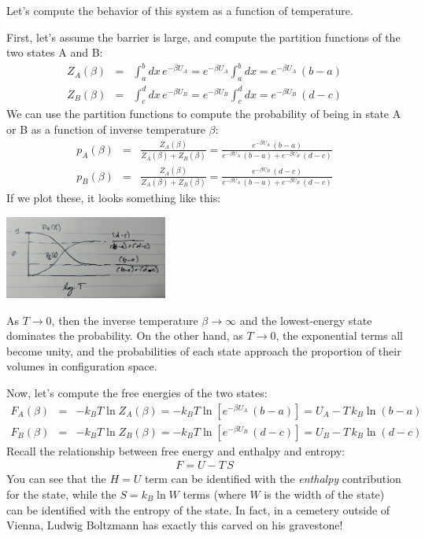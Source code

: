 \documentclass[english,course]{lecture}
\begin{document}
Let's compute the behavior of this system as a function of temperature.

First, let's assume the barrier is large, and compute the partition functions of the two states A and B:
\begin{eqnarray}
Z_A(\beta) &=& \int_a^b dx \, e^{-\beta U_A} = e^{-\beta U_A} \int_a^b dx = e^{-\beta U_A} \, (b-a) \\
Z_B(\beta) &=& \int_c^d dx \, e^{-\beta U_B} = e^{-\beta U_B} \int_c^d dx = e^{-\beta U_B} \, (d-c)
\end{eqnarray}
We can use the partition functions to compute the probability of being in state A or B as a function of inverse temperature $\beta$:
\begin{eqnarray}
p_A(\beta) &=& \frac{Z_A(\beta)}{Z_A(\beta) + Z_B(\beta)} = \frac{e^{-\beta U_A} \, (b-a)}{ e^{-\beta U_A} \, (b-a) + e^{-\beta U_B} \, (d-c) } \\
p_B(\beta) &=& \frac{Z_A(\beta)}{Z_A(\beta) + Z_B(\beta)} = \frac{e^{-\beta U_B} \, (d-c)}{ e^{-\beta U_A} \, (b-a) + e^{-\beta U_B} \, (d-c) }
\end{eqnarray}
If we plot these, it looks something like this:

\begin{centering}
\includegraphics[width=0.4\textwidth]{figures/two-state-probability.jpg}

\end{centering}

As $T \rightarrow 0$, then the inverse temperature $\beta \rightarrow \infty$ and the lowest-energy state dominates the probability.
On the other hand, as $T \rightarrow 0$, the exponential terms all become unity, and the probabilities of each state approach the proportion of their volumes in configuration space.

Now, let's compute the free energies of the two states:
\begin{eqnarray}
F_A(\beta) &=& - k_B T \ln Z_A(\beta) = - k_B T \ln \left[ e^{-\beta U_A} \, (b-a) \right] = U_A - T \, k_B  \ln (b-a)  \\
F_B(\beta) &=& - k_B T \ln Z_B(\beta) = - k_B T \ln \left[ e^{-\beta U_B} \, (d-c) \right] = U_B - T \, k_B \ln (d-c)
\end{eqnarray}
Recall the relationship between free energy and enthalpy and entropy:
\begin{eqnarray}
F = U - T \, S
\end{eqnarray}
You can see that the $H = U$ term can be identified with the \emph{enthalpy} contribution for the state, while the $S = k_B \ln W$ terms (where $W$ is the width of the state) can be identified with the entropy of the state.
In fact, in a cemetery outside of Vienna, Ludwig Boltzmann has exactly this carved on his gravestone!
\end{document}
